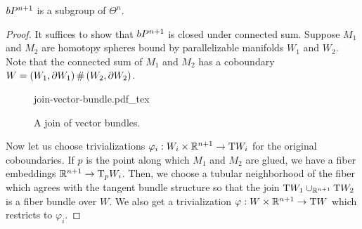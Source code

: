 \begin{proposition}
	$bP^{n+1}$ is a subgroup of $\Theta^n$.
\end{proposition}
\begin{proof}
	It suffices to show that $bP^{n+1}$ is closed under connected sum. Suppose $M_1$ and $M_2$ are homotopy spheres bound by parallelizable manifolds $W_1$ and $W_2$. Note that the connected sum of $M_1$ and $M_2$ has a coboundary $W=(W_1,\partial W_1)\+(W_2,\partial W_2)$.

	\begin{figure}[ht]
		\centering
		{join-vector-bundle.pdf_tex}
		\caption{A join of vector bundles.}
	\end{figure}
	
	Now let us choose trivializations $\varphi_i : W_i\times \mathbb{R}^{n+1} \to \mathrm{T} W_i$ for the original coboundaries. If $p$ is the point along which $M_1$ and $M_2$ are glued, we have a fiber embeddings $\mathbb{R}^{n+1}\to \mathrm{T}_p W_i$. Then, we choose a tubular neighborhood of the fiber which agrees with the tangent bundle structure so that the join $\mathrm{T} W_1\cup_{\mathbb{R}^{n+1}}\mathrm{T} W_2$ is a fiber bundle over $W$. We also get a trivialization $\varphi : W\times \mathbb{R}^{n+1} \to \mathrm{T} W$ which restricts to $\varphi_i$.
\end{proof}

\smallrule
